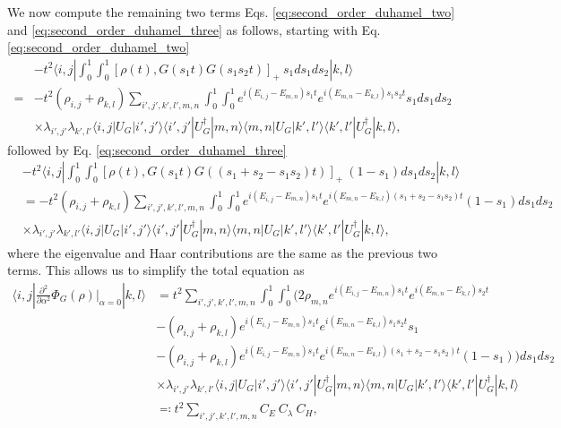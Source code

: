 \documentclass{article}
\newcommand{\ket}[1]{|#1\rangle}
\newcommand{\bra}[1]{\langle #1|}
\begin{document}
We now compute the remaining two terms Eqs. \eqref{eq:second_order_duhamel_two} and \eqref{eq:second_order_duhamel_three} as follows, starting with Eq. \eqref{eq:second_order_duhamel_two}
\begin{align}
    &-t^2 \bra{i,j} \int_0^1 \int_0^1 [\rho(t), G(s_1 t) G(s_1 s_2 t)]_+ ~s_1 ds_1 ds_2 \ket{k,l} \\
    =& -t^2 (\rho_{i,j} + \rho_{k,l}) \sum_{i',j',k',l',m,n} \int_0^1 \int_0^1 e^{i(E_{i,j} - E_{m,n})s_1 t} e^{i(E_{m,n} - E_{k,l})s_1 s_2 t} s_1 ds_1 ds_2 \\
    &\times \lambda_{i',j'} \lambda_{k',l'} \bra{i,j} U_G \ket{i',j'} \bra{i',j'} U_G^\dagger \ket{m,n} \bra{m,n} U_G \ket{k',l'} \bra{k',l'} U_G^\dagger \ket{k,l},
\end{align}
followed by Eq. \eqref{eq:second_order_duhamel_three}
\begin{align}
    &-t^2 \bra{i,j} \int_0^1 \int_0^1 [\rho(t), G(s_1 t) G((s_1 + s_2 - s_1 s_2) t)]_+ ~ (1- s_1) ds_1 ds_2 \ket{k,l} \\
    &= -t^2 (\rho_{i,j} + \rho_{k,l}) \sum_{i',j',k',l',m,n} \int_0^1 \int_0^1 e^{i(E_{i,j} - E_{m,n})s_1 t} e^{i(E_{m,n} - E_{k,l})(s_1 + s_2 - s_1 s_2)t} (1-s_1)ds_1 ds_2 \\
    &\times \lambda_{i',j'} \lambda_{k',l'} \bra{i,j} U_G \ket{i',j'} \bra{i',j'} U_G^\dagger \ket{m,n} \bra{m,n} U_G \ket{k',l'} \bra{k',l'} U_G^\dagger \ket{k,l},
\end{align}
where the eigenvalue and Haar contributions are the same as the previous two terms. This allows us to simplify the total equation as
\begin{align}
    \bra{i,j} \frac{\partial^2}{\partial \alpha^2} \Phi_G(\rho) \bigg|_{\alpha = 0} \ket{k,l} &= t^2 \sum_{i',j',k',l',m,n} \int_0^1 \int_0^1 \bigg(  2 \rho_{m,n} e^{i(E_{i,j} - E_{m,n})s_1t} e^{i(E_{m,n} - E_{k,l})s_2 t}  \\
    &- (\rho_{i,j} + \rho_{k,l}) e^{i(E_{i,j} - E_{m,n})s_1 t} e^{i(E_{m,n} - E_{k,l})s_1 s_2 t} s_1 \\
    &- (\rho_{i,j} + \rho_{k,l}) e^{i(E_{i,j} - E_{m,n})s_1 t} e^{i(E_{m,n} - E_{k,l})(s_1 + s_2 - s_1 s_2)t} (1-s_1) \bigg) ds_1 ds_2 \\
    &\times \lambda_{i',j'} \lambda_{k',l'} \bra{i,j} U_G \ket{i',j'} \bra{i',j'} U_G^\dagger \ket{m,n} \bra{m,n} U_G \ket{k',l'} \bra{k',l'} U_G^\dagger \ket{k,l} \\
    &\eqqcolon t^2 \sum_{i',j',k',l',m,n} C_{E} ~ C_{\lambda} ~ C_{H},
\end{align}
\end{document}
